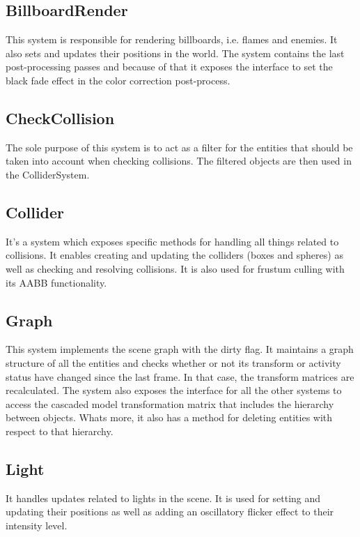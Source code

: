 \documentclass[12pt, english]{article}
\begin{document}
\subsection{BillboardRender}

This system is responsible for rendering billboards, i.e. flames and enemies.
It also sets and updates their positions in the world. The system contains the
last post-processing passes and because of that it exposes the interface to set
the black fade effect in the color correction post-process.

\subsection{CheckCollision}

The sole purpose of this system is to act as a filter for the entities that
should be taken into account when checking collisions. The filtered objects are
then used in the ColliderSystem.

\subsection{Collider}

It's a system which exposes specific methods for handling all things related to
collisions. It enables creating and updating the colliders (boxes and spheres)
as well as checking and resolving collisions. It is also used for frustum
culling with its AABB functionality.

\subsection{Graph}

This system implements the scene graph with the dirty flag. It maintains a
graph structure of all the entities and checks whether or not its transform or
activity status have changed since the last frame. In that case, the transform
matrices are recalculated. The system also exposes the interface for all the
other systems to access the cascaded model transformation matrix that includes
the hierarchy between objects. Whats more, it also has a method for deleting
entities with respect to that hierarchy.

\subsection{Light}

It handles updates related to lights in the scene. It is used for setting and
updating their positions as well as adding an oscillatory flicker effect to
their intensity level.
\end{document}
